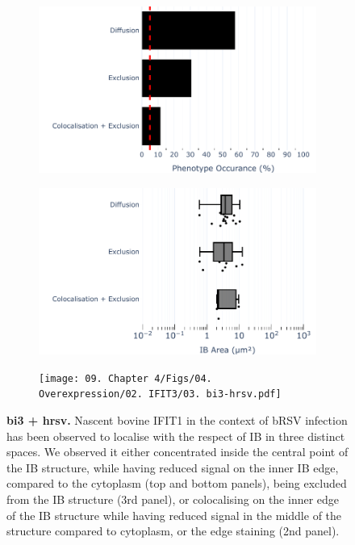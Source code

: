 \begin{figure}
    \begin{subfigure}{0.5\textwidth}
        \caption{}
        \includegraphics[width=1\linewidth]{09. Chapter 4/Figs/04. Overexpression/02. IFIT3/01. bar_i3_hrsv.pdf} 
    \end{subfigure}
    \begin{subfigure}{0.5\textwidth}
        \caption{}
        \includegraphics[width=1\linewidth]{09. Chapter 4/Figs/04. Overexpression/02. IFIT3/02. box_i3_hrsv.pdf}
    \end{subfigure}
    \begin{subfigure}{1\textwidth}
        \centering
        \caption{}
        \texttt{[image: 09. Chapter 4/Figs/04. Overexpression/02. IFIT3/03. bi3-hrsv.pdf]}
    \end{subfigure}
    \caption[bi3 + hrsv]{\textbf{bi3 + hrsv.} Nascent bovine IFIT1 in the context of bRSV infection has been observed to localise with the respect of IB in three distinct spaces. We observed it either concentrated inside the central point of the IB structure, while having reduced signal on the inner IB edge, compared to the cytoplasm (top and bottom panels), being excluded from the IB structure (3rd panel), or colocalising on the inner edge of the IB structure while having reduced signal in the middle of the structure compared to cytoplasm, or the edge staining (2nd panel).}
    \label{fig:bi3 + hrsv}
\end{figure}

